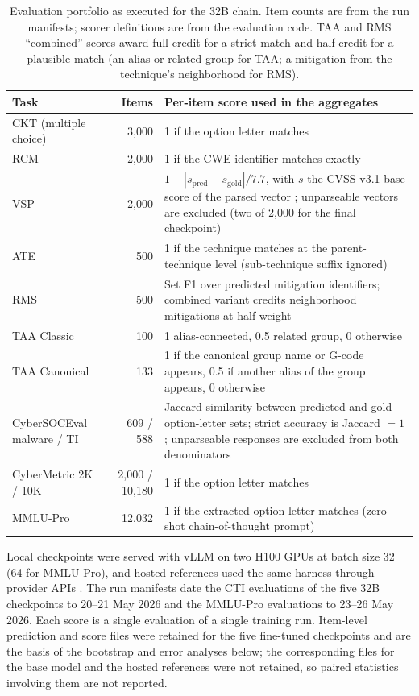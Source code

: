 \documentclass[a4paper,fleqn]{cas-dc}
\begin{document}
\begin{table}
\centering\footnotesize
\caption{Evaluation portfolio as executed for the 32B chain. Item counts are from the run manifests; scorer definitions are from the evaluation code. TAA and RMS ``combined'' scores award full credit for a strict match and half credit for a plausible match (an alias or related group for TAA; a mitigation from the technique's neighborhood for RMS).}\label{tab:portfolio}
\begin{tabularx}{\textwidth}{@{}lrX@{}}
\toprule Task & Items & Per-item score used in the aggregates \\\midrule
CKT (multiple choice) & 3,000 & 1 if the option letter matches \\
RCM & 2,000 & 1 if the CWE identifier matches exactly \\
VSP & 2,000 & $1-|s_{\text{pred}}-s_{\text{gold}}|/7.7$, with $s$ the CVSS v3.1 base score of the parsed vector \citep{first2019cvss}; unparseable vectors are excluded (two of 2,000 for the final checkpoint) \\
ATE & 500 & 1 if the technique matches at the parent-technique level (sub-technique suffix ignored) \\
RMS & 500 & Set F1 over predicted mitigation identifiers; combined variant credits neighborhood mitigations at half weight \\
TAA Classic & 100 & 1 alias-connected, 0.5 related group, 0 otherwise \\
TAA Canonical & 133 & 1 if the canonical group name or G-code appears, 0.5 if another alias of the group appears, 0 otherwise \\
CyberSOCEval malware / TI & 609 / 588 & Jaccard similarity between predicted and gold option-letter sets; strict accuracy is Jaccard $=1$; unparseable responses are excluded from both denominators \\
CyberMetric 2K / 10K & 2,000 / 10,180 & 1 if the option letter matches \\
MMLU-Pro & 12,032 & 1 if the extracted option letter matches (zero-shot chain-of-thought prompt) \\\bottomrule
\end{tabularx}
\end{table}

Local checkpoints were served with vLLM \citep{kwon2023vllm} on two H100 GPUs at batch size 32 (64 for MMLU-Pro), and hosted references used the same harness through provider APIs \citep{glaukopis2026software}. The run manifests date the CTI evaluations of the five 32B checkpoints to 20--21 May 2026 and the MMLU-Pro evaluations to 23--26 May 2026. Each score is a single evaluation of a single training run. Item-level prediction and score files were retained for the five fine-tuned checkpoints and are the basis of the bootstrap and error analyses below; the corresponding files for the base model and the hosted references were not retained, so paired statistics involving them are not reported.
\end{document}
